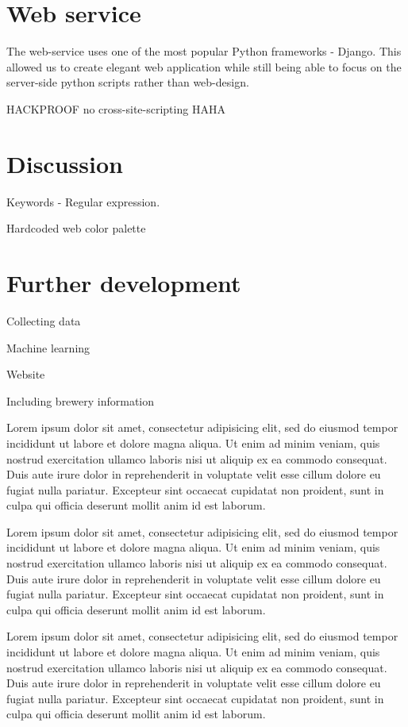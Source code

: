 \documentclass[10pt]{IEEEtran}
\begin{document}
\section{Web service}

The web-service uses one of the most popular Python frameworks - Django. This allowed us to create elegant web application while still being able to focus on the server-side python scripts rather than web-design. 

HACKPROOF no cross-site-scripting HAHA

\section{Discussion}

Keywords - Regular expression.

Hardcoded web color palette

\section{Further development}
Collecting data

Machine learning

Website

Including brewery information








Lorem ipsum dolor sit amet, consectetur adipisicing elit, sed do
eiusmod tempor incididunt ut labore et dolore magna aliqua. Ut enim ad
minim veniam, quis nostrud exercitation ullamco laboris nisi ut
aliquip ex ea commodo consequat. Duis aute irure dolor in
reprehenderit in voluptate velit esse cillum dolore eu fugiat nulla
pariatur. Excepteur sint occaecat cupidatat non proident, sunt in
culpa qui officia deserunt mollit anim id est laborum.

Lorem ipsum dolor sit amet, consectetur adipisicing elit, sed do
eiusmod tempor incididunt ut labore et dolore magna aliqua. Ut enim ad
minim veniam, quis nostrud exercitation ullamco laboris nisi ut
aliquip ex ea commodo consequat. Duis aute irure dolor in
reprehenderit in voluptate velit esse cillum dolore eu fugiat nulla
pariatur. Excepteur sint occaecat cupidatat non proident, sunt in
culpa qui officia deserunt mollit anim id est laborum.

Lorem ipsum dolor sit amet, consectetur adipisicing elit, sed do
eiusmod tempor incididunt ut labore et dolore magna aliqua. Ut enim ad
minim veniam, quis nostrud exercitation ullamco laboris nisi ut
aliquip ex ea commodo consequat. Duis aute irure dolor in
reprehenderit in voluptate velit esse cillum dolore eu fugiat nulla
pariatur. Excepteur sint occaecat cupidatat non proident, sunt in
culpa qui officia deserunt mollit anim id est laborum.
\end{document}
